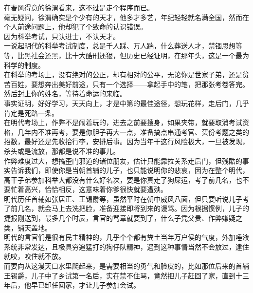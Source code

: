 \begin{multicols}{\theparacolNo}
在春风得意的徐渭看来，这不过是走个程序而已。\\

毫无疑问，徐渭确实是个少有的天才，他多才多艺，年纪轻轻就名满全国，然而在个人前途问题上，他却犯了个致命的认识错误。\\

因为科举考试，只认进士，不认天才。\\

一说起明代的科举考试制度，总是千人踩、万人踹，什么葬送人才，禁锢思想等等，比黑社会还黑，比十大酷刑还狠，但历史已经证明，在那年头，这是一个最为科学的制度。\\

在科举的考场上，没有绝对的公正，却有相对的公平，无论你是世家子弟，还是贫苦百姓，要想奔出美好前途，只有一个选择——拿起手中的笔，把那张考卷答完。然后封上你的姓名，等待着命运的来临。\\

事实证明，好好学习，天天向上，才是中第的最佳途径，想玩花样，走后门，几乎肯定是死路一条。\\

在明代考场上，作弊不是闹着玩的，进去之前要搜身，如果夹带，就要取消考试资格，几年内不准再考，要是你胆子再大一点，准备搞点串通考官、买份考题之类的招数，最好还是先收拾行李，安排后事。因为当年干这行风险极大，一旦被发现，杀头或是流放，那都是说不准的事儿。\\

作弊难度过大，想搞歪门邪道的诸位朋友，估计只能靠拉关系走后门，但残酷的事实告诉我们，即使你是当朝首辅的儿子，也只能说明你的悲哀，因为在整个明代，高干子弟参加科举大都没有什么好名次，要是你真走了狗屎运，考了前几名，也不要忙着高兴，恰恰相反，这意味着你爹很快就要遭殃。\\

明代历任首辅如张居正、王锡爵等，虽然平时在朝中威风八面，但只要听说儿子考了前几名，就会马上去洗把脸，准备迎接即将到来的谩骂。因为根据惯例，儿子的捷报刚送到，最多几个时辰，言官的骂章就要到了，什么子凭父贵、作弊嫌疑之类，铺天盖地。\\

明代的言官们是很有民主精神的，几乎个个都有粪土当年万户侯的气度，外加唾液系统非常发达，且极具穷追猛打的狗仔队精神，遇到这种事情当然不会放过，逮住就咬，咬住就不放。\\

而要向从这漫天口水里爬起来，是需要相当的勇气和脸皮的，比如那位后来的首辅王锡爵，儿子中了乡试第一名后，实在禁不住骂，竟然把儿子赶回了家，直到十三年后，他早已卸任回家，才让儿子参加会试。\\


\end{multicols}
